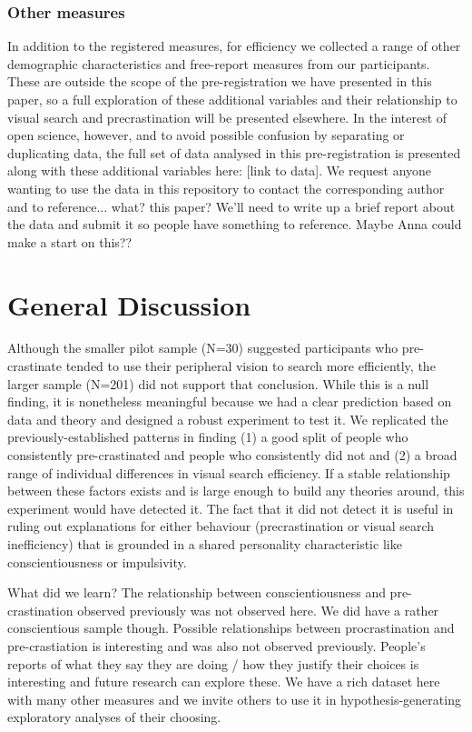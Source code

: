\documentclass[]{rsos}
\begin{document}
\subsubsection{Other measures}

In addition to the registered measures, for efficiency we collected a range of other demographic characteristics and free-report measures from our participants. These are outside the scope of the pre-registration we have presented in this paper, so a full exploration of these additional variables and their relationship to visual search and precrastination will be presented elsewhere. In the interest of open science, however, and to avoid possible confusion by separating or duplicating data, the full set of data analysed in this pre-registration is presented along with these additional variables here: [link to data]. We request anyone wanting to use the data in this repository to contact the corresponding author and to reference... what? this paper? We'll need to write up a brief report about the data and submit it so people have something to reference. Maybe Anna could make a start on this??


\section{General Discussion}
Although the smaller pilot sample (N=30) suggested participants who pre-crastinate tended to use their peripheral vision to search more efficiently, the larger sample (N=201) did not support that conclusion. While this is a null finding, it is nonetheless meaningful because we had a clear prediction based on data and theory and designed a robust experiment to test it. We replicated the previously-established patterns in finding (1) a good split of people who consistently pre-crastinated and people who consistently did not and (2) a broad range of individual differences in visual search efficiency. If a stable relationship between these factors exists and is large enough to build any theories around, this experiment would have detected it. The fact that it did not detect it is useful in ruling out explanations for either behaviour (precrastination or visual search inefficiency) that is grounded in a shared personality characteristic like conscientiousness or impulsivity.

What did we learn?
The relationship between conscientiousness and pre-crastination observed previously was not observed here. We did have a rather conscientious sample though.
Possible relationships between procrastination and pre-crastiation is interesting and was also not observed previously.
People's reports of what they say they are doing / how they justify their choices is interesting and future research can explore these.
We have a rich dataset here with many other measures and we invite others to use it in hypothesis-generating exploratory analyses of their choosing.



\small

\end{document}
